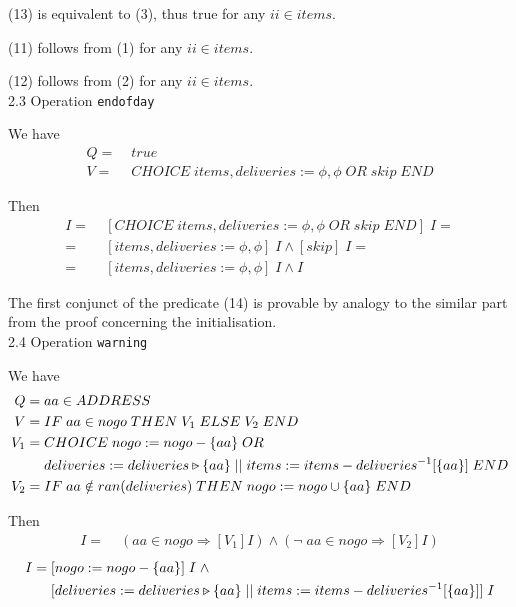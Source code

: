 \documentclass[11pt]{article}
\begin{document}
(13) is equivalent to (3), thus true for any $ii \in items$.

(11) follows from (1) for any $ii \in items$.

(12) follows from (2) for any $ii \in items$. \\


2.3 Operation \texttt{endofday} 

We have 
\begin{align}
  Q = \; & true \nonumber \\
	V = \; & CHOICE \; items,deliveries := \phi, \phi \; OR \; skip \; END \nonumber
\end{align}

Then
\begin{align}
    [V]I = & \; [CHOICE \; items,deliveries := \phi, \phi \; OR \; skip \; END] \; I \nonumber = \\
		     = & \; [items,deliveries := \phi, \phi]\;I \wedge [skip]\;I = \nonumber \\
				 = & \; [items,deliveries := \phi, \phi]\;I \wedge I
\end{align}

The first conjunct of the predicate (14) is provable by analogy to the similar part from the proof concerning the initialisation. \\


2.4 Operation \texttt{warning} 

We have 
\begin{align}
  Q = \; & aa \in ADDRESS  \\
	V = \; &  IF \; aa \in nogo \; THEN \; V_1 \; ELSE \; V_2 \; END \nonumber \\
	V_1 = \; & CHOICE \; nogo := nogo - \{aa\} \; OR \nonumber \\
	         & deliveries := deliveries \mathbin{\triangleright \llap{--}} \{aa\} \; || \; items := items - deliveries^{-1}[\{aa\}] \; END\nonumber  \\
	V_2	= \; & IF \; aa \notin ran(deliveries) \; THEN \; nogo := nogo \cup \{aa\} \; END \nonumber			
\end{align}

Then
\begin{align}
  [V] I = & \; (aa \in nogo \Rightarrow [V_1]I) \wedge (\neg \; aa \in nogo \Rightarrow [V_2]I)
\end{align}
\begin{align}
  [V_1]I = \; & [nogo := nogo - \{aa\}] \; I \; \wedge \\
	            & [deliveries := deliveries \mathbin{\triangleright \llap{--}}
 \{aa\} \; || \; items := items - deliveries^{-1}[\{aa\}]] \; I
\end{align}
\end{document}
